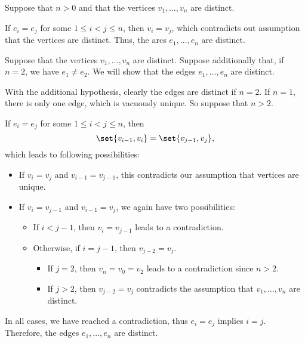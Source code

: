 \begin{defproof}

   Suppose that \( n > 0 \) and that the vertices \( v_1, \ldots, v_n \) are distinct.

  If \( e_i = e_j \) for some \( 1 \leq i < j \leq n \), then \( v_i = v_j \), which contradicts out assumption that the vertices are distinct. Thus, the arcs \( e_1, \ldots, e_n \) are distinct.

   Suppose that the vertices \( v_1, \ldots, v_n \) are distinct. Suppose additionally that, if \( n = 2 \), we have \( e_1 \neq e_2 \). We will show that the edges \( e_1, \ldots, e_n \) are distinct.

  With the additional hypothesis, clearly the edges are distinct if \( n = 2 \). If \( n = 1 \), there is only one edge, which is vacuously unique. So suppose that \( n > 2 \).

  If \( e_i = e_j \) for some \( 1 \leq i < j \leq n \), then
  \begin{equation*}
    \set{ v_{i - 1}, v_i } = \set{ v_{j - 1}, v_j },
  \end{equation*}
  which leads to following possibilities:
  \begin{itemize}
    \item If \( v_i = v_j \) and \( v_{i-1} = v_{j-1} \), this contradicts our assumption that vertices are unique.
    \item If \( v_i = v_{j-1} \) and \( v_{i-1} = v_j \), we again have two possibilities:
    \begin{itemize}
      \item If \( i < j - 1 \), then \( v_i = v_{j - 1} \) leads to a contradiction.
      \item Otherwise, if \( i = j - 1 \), then \( v_{j-2} = v_j \).
      \begin{itemize}
        \item If \( j = 2 \), then \( v_n = v_0 = v_2 \) leads to a contradiction since \( n > 2 \).
        \item If \( j > 2 \), then \( v_{j-2} = v_j \) contradicts the assumption that \( v_1, \ldots, v_n \) are distinct.
      \end{itemize}
    \end{itemize}
  \end{itemize}

  In all cases, we have reached a contradiction, thus \( e_i = e_j \) implies \( i = j \). Therefore, the edges \( e_1, \ldots, e_n \) are distinct.


\end{defproof}
